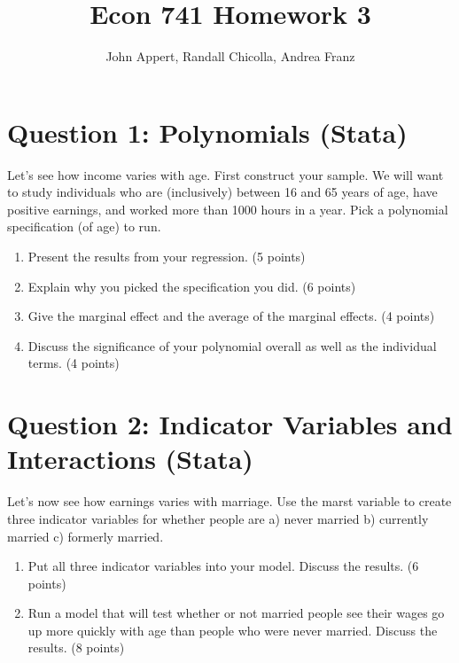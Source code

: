 \documentclass{article}
\begin{document}
\title{Econ 741 Homework 3}
\author{John Appert, Randall Chicolla, Andrea Franz}
\maketitle

\section{Question 1:  Polynomials (Stata)}
Let’s see how income varies with age. First construct your sample. We will want to
study individuals who are (inclusively) between 16 and 65 years of age, have positive earnings, and worked more than 1000 hours in a year. Pick a polynomial specification (of age) to run.

\begin{enumerate}[label=\alph*]
\item Present the results from your regression.  (5 points)

\item Explain why you picked the specification you did.  (6 points)

\item  Give the marginal effect and the average of the marginal effects.  (4 points)

\item  Discuss the significance of your polynomial overall as well as the individual terms.  (4 points)

\end{enumerate}

\section{Question 2:  Indicator Variables and Interactions  (Stata)}
Let’s now see how earnings varies with marriage. Use the marst variable to create
three indicator variables for whether people are a) never married b) currently married c) formerly married.

\begin{enumerate}[label=\alph*]
\item  Put all three indicator variables into your model. Discuss the results. (6 points)

\item Run a model that will test whether or not married people see their wages go up
more quickly with age than people who were never married. Discuss the results.
(8 points)

\end{enumerate}
\end{document}

